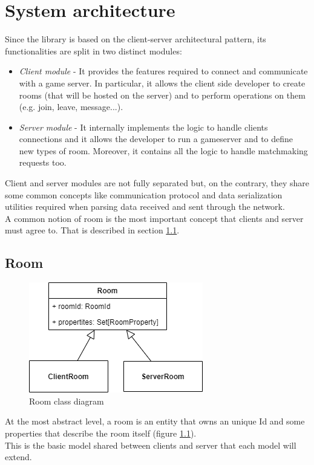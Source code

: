 \chapter{System architecture}
Since the library is based on the client-server architectural pattern, its functionalities are split in two distinct modules:
\begin{itemize}
	\item \textit{Client module} - It provides the features required to connect and communicate with a game server. In particular, it allows the client side developer to create rooms (that will be hosted on the server) and to perform operations on them (e.g. join, leave, message...).
	\item \textit{Server module} - It internally implements the logic to handle clients connections and it allows the developer to run a gameserver and to define new types of room. Moreover, it contains all the logic to handle matchmaking requests too.
\end{itemize}

Client and server modules are not fully separated but, on the contrary, they share some common concepts like communication protocol and data serialization utilities required when parsing data received and sent through the network.
\\
A common notion of room is the most important concept that clients and server must agree to. That is described in section \ref{room-arch}.

\section{Room} \label{room-arch}


\begin{figure}[H]
	\centering
	\includegraphics[scale=0.7]{images/3-architecture/room-class-3.png}
	\caption{Room class diagram}
	\label{fig:room_classes}
\end{figure}


At the most abstract level, a room is an entity that owns an unique Id and some properties that describe the room itself (figure \ref{fig:room_classes}).
\\
This is the basic model shared between clients and server that each model will extend.

